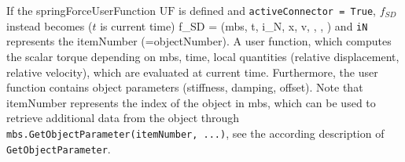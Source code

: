     If the springForceUserFunction $\mathrm{UF}$ is defined and \texttt{activeConnector = True}, 
    $f_{SD}$ instead becomes ($t$ is current time)
    \be
      f_{SD} = (mbs, t, i_N, \Delta x, \Delta v, , , )
    \ee
    and \texttt{iN} represents the itemNumber (=objectNumber).
    A user function, which computes the scalar torque depending on mbs, time, local quantities 
    (relative displacement, relative velocity), which are evaluated at current time. 
    Furthermore, the user function contains object parameters (stiffness, damping, offset).
    Note that itemNumber represents the index of the object in mbs, which can be used to retrieve additional data from the object through
    \texttt{mbs.GetObjectParameter(itemNumber, ...)}, see the according description of \texttt{GetObjectParameter}.
    
